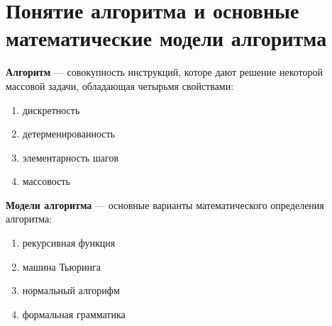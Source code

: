 \section{Понятие алгоритма и основные математические модели алгоритма}
\dftion \textbf{Алгоритм} --- совокупность инструкций, которе дают решение некоторой массовой задачи, обладающая четырьмя свойствами:
\begin{enumerate}
    \item дискретность
    \item детерменированность
    \item элементарность шагов
    \item массовость
\end{enumerate}

\dftion \textbf{Модели алгоритма} --- основные варианты математического определения алгоритма:
\begin{enumerate}
    \item рекурсивная функция
    \item машина Тьюринга
    \item нормальный алгорифм
    \item формальная грамматика
\end{enumerate}